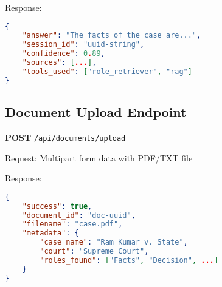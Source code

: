 \documentclass[12pt,a4paper]{article}
\newcommand{\code}[1]{\texttt{#1}}
\begin{document}
Response:
\begin{lstlisting}[language=json]
{
    "answer": "The facts of the case are...",
    "session_id": "uuid-string",
    "confidence": 0.89,
    "sources": [...],
    "tools_used": ["role_retriever", "rag"]
}
\end{lstlisting}

\subsection{Document Upload Endpoint}

\textbf{POST} \code{/api/documents/upload}

Request: Multipart form data with PDF/TXT file

Response:
\begin{lstlisting}[language=json]
{
    "success": true,
    "document_id": "doc-uuid",
    "filename": "case.pdf",
    "metadata": {
        "case_name": "Ram Kumar v. State",
        "court": "Supreme Court",
        "roles_found": ["Facts", "Decision", ...]
    }
}
\end{lstlisting}
\end{document}
